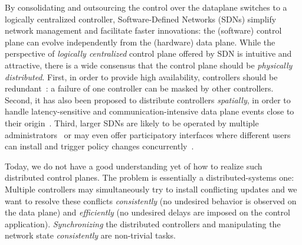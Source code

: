 \documentclass[conference]{sigcomm-alternate}
\begin{document}
By consolidating and outsourcing the control over the dataplane switches to a logically
centralized controller, Software-Defined Networks (SDNs)
simplify network management and facilitate faster innovations:
the (software) control plane can evolve independently from the
(hardware) data plane.
%
While the perspective of \emph{logically centralized} control plane
offered by SDN is intuitive and attractive,
there is a wide consensus that
the control plane should be  \emph{physically distributed}.
First, in order to provide high availability,
controllers should be redundant~\cite{onix,onos,elasticon}: a failure
of one controller can be masked by other controllers.
Second, it has also been proposed to distribute controllers \emph{spatially}, in order to handle latency-sensitive and
communication-intensive
data plane
events close to their origin~\cite{devoflow,kandoo}.
Third, larger SDNs are likely to be operated by multiple administrators~\cite{stn} or may even offer
participatory interfaces where different users can install and trigger policy changes
concurrently~\cite{participatory}.


Today, we do not have a good understanding yet of how to realize
such distributed control planes. The problem is essentially a
distributed-systems
one: Multiple controllers may simultaneously try to
install conflicting updates and we want to resolve these conflicts
\emph{consistently} (no undesired behavior is observed on the data
plane) and \emph{efficiently} (no undesired delays are imposed on the
control application).
\emph{Synchronizing}
the distributed controllers and manipulating the network state \emph{consistently}
are non-trivial tasks.~\cite{sharon}
\end{document}
